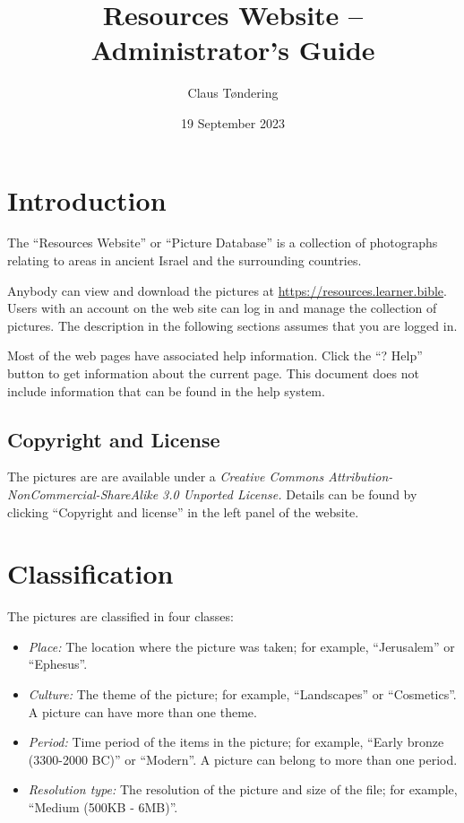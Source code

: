 \documentclass[11pt,oneside,a4paper,article]{memoir}
\title{Resources Website -- Administrator's Guide}
\author{Claus Tøndering}
\date{19 September 2023}
\begin{document}
\maketitle


\chapter{Introduction}

The ``Resources Website'' or ``Picture Database'' is a collection of photographs relating to areas
in ancient Israel and the surrounding countries.

Anybody can view and download the pictures at \url{https://resources.learner.bible}. Users with an
account on the web site can log in and manage the collection of pictures. The description in the
following sections assumes that you are logged in.

Most of the web pages have associated help information. Click the ``? Help'' button to get
information about the current page. This document does not include information that can be found in
the help system.

\section{Copyright and License}

The pictures are are available under a \emph{Creative Commons Attribution-NonCommercial-ShareAlike 3.0
  Unported License.} Details can be found by clicking ``Copyright and license'' in the left panel of
the website.

\chapter{Classification}

The pictures are classified in four classes:

\begin{itemize}
\item \emph{Place:} The location where the picture was taken; for example, ``Jerusalem'' or
  ``Ephesus''.
\item \emph{Culture:} The theme of the picture; for example, ``Landscapes'' or ``Cosmetics''. A
  picture can have more than one theme.
\item \emph{Period:} Time period of the items in the picture; for example, ``Early bronze (3300-2000
  BC)'' or ``Modern''. A picture can belong to more than one period.
\item \emph{Resolution type:} The resolution of the picture and size of the file; for example,
  ``Medium (500KB - 6MB)''.
\end{itemize}
\end{document}
